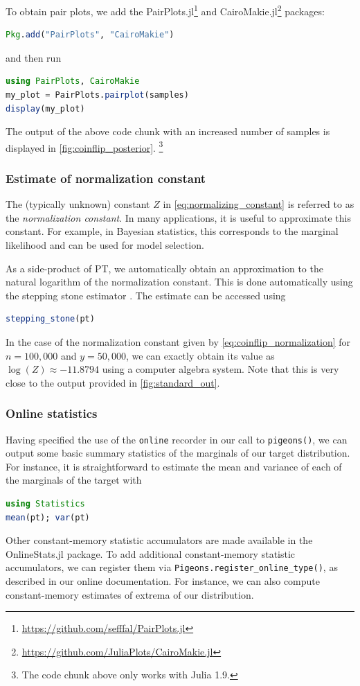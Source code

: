 \medskip 
To obtain pair plots, we add the 
PairPlots.jl\footnote{\url{https://github.com/sefffal/PairPlots.jl}}
and CairoMakie.jl\footnote{\url{https://github.com/JuliaPlots/CairoMakie.jl}}
packages:
\begin{lstlisting}[language=Julia]
Pkg.add("PairPlots", "CairoMakie")
\end{lstlisting}
and then run
\begin{lstlisting}[language=Julia]
using PairPlots, CairoMakie
my_plot = PairPlots.pairplot(samples) 
display(my_plot)
\end{lstlisting}
The output of the above code chunk with an increased number of samples 
is displayed in \cref{fig:coinflip_posterior}.
\footnote{The code chunk above only works with Julia 1.9.}


\subsubsection{Estimate of normalization constant}
The (typically unknown) constant $Z$ in \cref{eq:normalizing_constant} is 
referred to as the \emph{normalization constant}. 
In many applications, it is useful to approximate this constant. 
For example, in Bayesian statistics, this corresponds to the 
marginal likelihood and can be used for model selection. 

\medskip 
As a side-product of PT, we automatically obtain an approximation to the natural 
logarithm of the normalization constant. This is done automatically using the 
stepping stone estimator \cite{xie2011improving}.
The estimate can be accessed using
\begin{lstlisting}[language=Julia]
stepping_stone(pt)
\end{lstlisting}
In the case of the normalization constant given by \cref{eq:coinflip_normalization} 
for $n=100,000$ and $y=50,000$, we can exactly obtain its value as $\log(Z) \approx -11.8794$ 
using a computer algebra system. Note that this is very close to the output provided in 
\cref{fig:standard_out}.

\subsubsection{Online statistics}
\label{sec:online_stats}
Having specified the use of the \texttt{online} recorder in our call to \texttt{pigeons()}, 
we can output some basic summary statistics of the marginals of our target distribution. 
For instance, it is straightforward to estimate the mean and variance of each 
of the marginals of the target with 
\begin{lstlisting}[language=Julia]
using Statistics
mean(pt); var(pt)
\end{lstlisting}
Other constant-memory statistic accumulators are made available in the 
OnlineStats.jl \cite{day2020onlinestats} package. 
To add additional constant-memory statistic accumulators, we 
can register them via \texttt{Pigeons.register\_online\_type()}, as described in our 
online documentation. For instance, we can also compute constant-memory estimates 
of extrema of our distribution.


